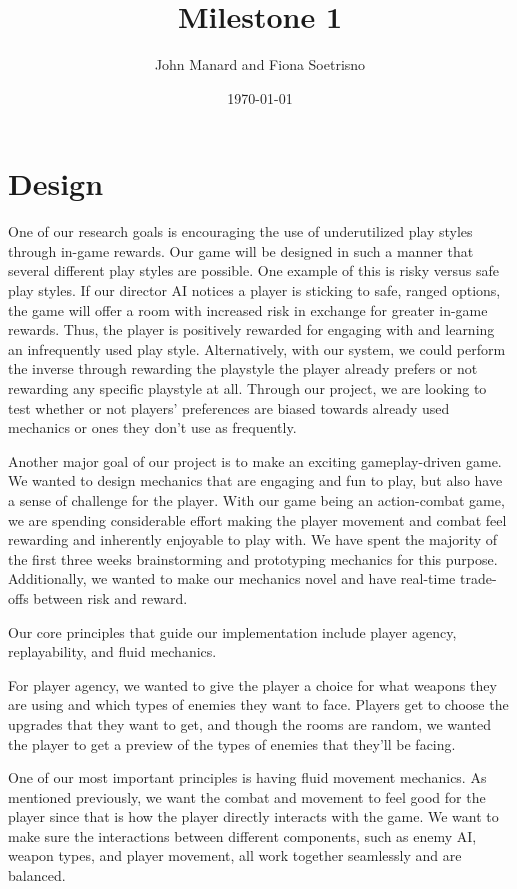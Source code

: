 \documentclass[12pt]{article}
\title{Milestone 1}   %
\author{John Manard and Fiona Soetrisno}         %
\date{\today}
\begin{document}
\maketitle
\newpage
\section{Design}

One of our research goals is encouraging the use of underutilized play styles through in-game rewards. Our game will be designed in such a manner that several different play styles are possible. One example of this is risky versus safe play styles. If our director AI notices a player is sticking to safe, ranged options, the game will offer a room with increased risk in exchange for greater in-game rewards. Thus, the player is positively rewarded for engaging with and learning an infrequently used play style. Alternatively, with our system, we could perform the inverse through rewarding the playstyle the player already prefers or not rewarding any specific playstyle at all. Through our project, we are looking to test whether or not players’ preferences are biased towards already used mechanics or ones they don’t use as frequently.

Another major goal of our project is to make an exciting gameplay-driven game. We wanted to design mechanics that are engaging and fun to play, but also have a sense of challenge for the player. With our game being an action-combat game, we are spending considerable effort making the player movement and combat feel rewarding and inherently enjoyable to play with. We have spent the majority of the first three weeks brainstorming and prototyping mechanics for this purpose. Additionally, we wanted to make our mechanics novel and have real-time trade-offs between risk and reward.

Our core principles that guide our implementation include player agency, replayability, and fluid mechanics. 

For player agency, we wanted to give the player a choice for what weapons they are using and which types of enemies they want to face. Players get to choose the upgrades that they want to get, and though the rooms are random, we wanted the player to get a preview of the types of enemies that they’ll be facing.

One of our most important principles is having fluid movement mechanics. As mentioned previously, we want the combat and movement to feel good for the player since that is how the player directly interacts with the game. We want to make sure the interactions between different components, such as enemy AI, weapon types, and player movement, all work together seamlessly and are balanced.
\end{document}
